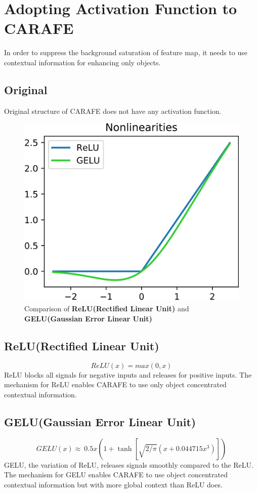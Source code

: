 \documentclass[10pt,twocolumn,letterpaper]{article}
\begin{document}
\section{Adopting Activation Function to CARAFE}
\label{sec:formatting}
In order to suppress the background saturation of feature map, it needs to use contextual information for enhancing only objects.

\subsection{Original}
Original structure of CARAFE\cite{CARAFEimpl} does not have any activation function.

\begin{figure}
    \centering
    \includegraphics[width=0.8\linewidth]{./img/relu-gelu.png}
    \caption{Comparison of \textbf{ReLU(Rectified Linear Unit)} and \textbf{GELU(Gaussian Error Linear Unit)}}
    \label{fig:relu-gelu}
\end{figure}

\subsection{ReLU(Rectified Linear Unit)\cite{RELU}}
\begin{equation*}
    ReLU(x)=max(0,x)
\end{equation*}
ReLU blocks all signals for negative inputs and releases for positive inputs.
The mechanism for ReLU enables CARAFE to use only object concentrated contextual information.

\subsection{GELU(Gaussian Error Linear Unit)\cite{GELU}}
\begin{equation*}
    GELU(x)\approx\ 0.5x(1+\tanh{[\sqrt{2/\pi}(x+0.044715x^3)]})
\end{equation*}
GELU, the variation of ReLU, releases signals smoothly compared to the ReLU. The mechanism for GELU enables CARAFE to use object concentrated contextual information but with more global context than ReLU does.
\end{document}
